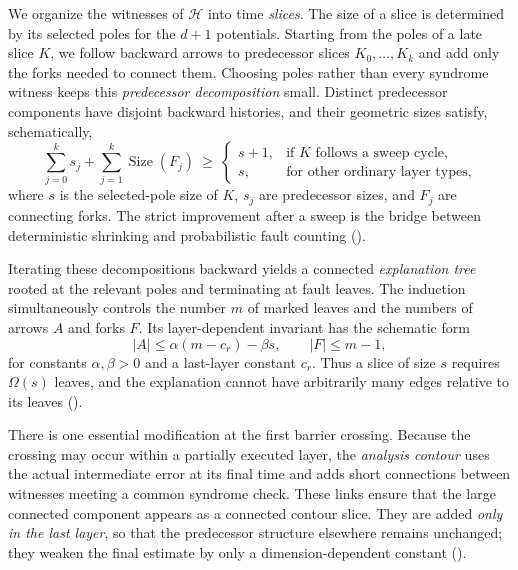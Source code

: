 

We organize the witnesses of $\mathcal H$ into time \emph{slices}. The size of a slice is determined by its selected poles for the $d+1$ potentials. Starting from the poles of a late slice $K$, we follow backward arrows to predecessor slices $K_0,\ldots,K_k$ and add only the forks needed to connect them. Choosing poles rather than every syndrome witness keeps this \emph{predecessor decomposition} small. Distinct predecessor components have disjoint backward histories, and their geometric sizes satisfy, schematically,
\begin{equation*}
  \sum_{j=0}^{k}s_j+\sum_{j=1}^{k}\operatorname{Size}(F_j)
  \ \geq\
  \begin{cases}
    s+1, & \text{if $K$ follows a sweep cycle},\\
    s,   & \text{for other ordinary layer types},
  \end{cases}
\end{equation*}
where $s$ is the selected-pole size of $K$, $s_j$ are predecessor sizes, and $F_j$ are connecting forks. The strict improvement after a sweep is the bridge between deterministic shrinking and probabilistic fault counting ().

Iterating these decompositions backward yields a connected \emph{explanation tree} rooted at the relevant poles and terminating at fault leaves. The induction simultaneously controls the number $m$ of marked leaves and the numbers of arrows $A$ and forks $F$. Its layer-dependent invariant has the schematic form
\begin{equation*}
  |A|\leq\alpha(m-c_r)-\beta s,
  \qquad |F|\leq m-1,
\end{equation*}
for constants $\alpha,\beta>0$ and a last-layer constant $c_r$. Thus a slice of size $s$ requires $\Omega(s)$ leaves, and the explanation cannot have arbitrarily many edges relative to its leaves ().

There is one essential modification at the first barrier crossing. Because the crossing may occur within a partially executed layer, the \emph{analysis contour} uses the actual intermediate error at its final time and adds short connections between witnesses meeting a common syndrome check. These links ensure that the large connected component appears as a connected contour slice. They are added \emph{only in the last layer}, so that the predecessor structure elsewhere remains unchanged; they weaken the final estimate by only a dimension-dependent constant ().


